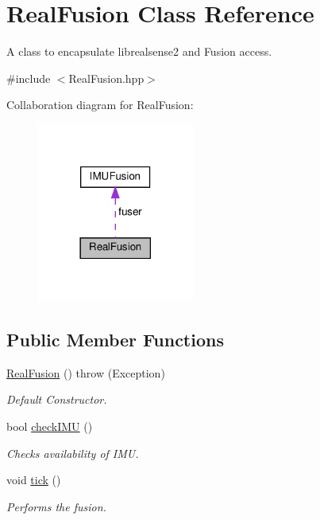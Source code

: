 \hypertarget{classRealFusion}{}\section{Real\+Fusion Class Reference}
\label{classRealFusion}


A class to encapsulate librealsense2 and Fusion access.  




{\ttfamily \#include $<$Real\+Fusion.\+hpp$>$}



Collaboration diagram for Real\+Fusion\+:\nopagebreak
\begin{figure}[H]
\begin{center}
\leavevmode
\includegraphics[width=146pt]{classRealFusion__coll__graph}
\end{center}
\end{figure}
\subsection*{Public Member Functions}
\begin{DoxyCompactItemize}
\item 
\hyperlink{classRealFusion_a9632f71572a51d7db415793e1976a958}{Real\+Fusion} ()  throw (\+Exception)
\begin{DoxyCompactList}\small\item\em Default Constructor. \end{DoxyCompactList}\item 
bool \hyperlink{classRealFusion_a77329f8bfa4390754ddb1c72b58281ff}{check\+I\+MU} ()
\begin{DoxyCompactList}\small\item\em Checks availability of I\+MU. \end{DoxyCompactList}\item 
void \hyperlink{classRealFusion_a0fa5b36d1b32622ec65c41e2c3852c2f}{tick} ()
\begin{DoxyCompactList}\small\item\em Performs the fusion. \end{DoxyCompactList}\end{DoxyCompactItemize}
